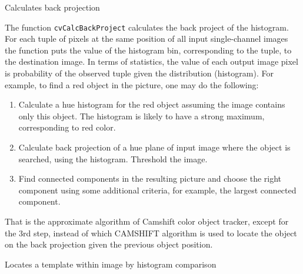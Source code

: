 \label{CalcBackProject}

Calculates back projection


\begin{description}
\end{description}

The function \texttt{cvCalcBackProject} calculates the back project of the histogram. For each tuple of pixels at the same position of all input single-channel images the function puts the value of the histogram bin, corresponding to the tuple, to the destination image. In terms of statistics, the value of each output image pixel is probability of the observed tuple given the distribution (histogram). For example, to find a red object in the picture, one may do the following:

\begin{enumerate}
 \item Calculate a hue histogram for the red object assuming the image contains only this object. The histogram is likely to have a strong maximum, corresponding to red color.
 \item Calculate back projection of a hue plane of input image where the object is searched, using the histogram. Threshold the image.
 \item Find connected components in the resulting picture and choose the right component using some additional criteria, for example, the largest connected component.
\end{enumerate}

That is the approximate algorithm of Camshift color object tracker, except for the 3rd step, instead of which CAMSHIFT algorithm is used to locate the object on the back projection given the previous object position.

\label{CalcBackProjectPatch}

Locates a template within image by histogram comparison


